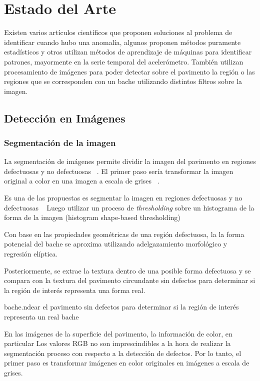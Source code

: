 \chapter{Estado del Arte}\label{chapter:state-of-the-art}

Existen varios artículos científicos que proponen soluciones al problema de identificar cuando hubo una anomalía, algunos proponen métodos
puramente estadísticos y otros utilizan métodos de aprendizaje de máquinas para identificar patrones, mayormente en la serie temporal del
acelerómetro. También utilizan procesamiento de imágenes para poder detectar sobre el pavimento la región o las regiones que se corresponden
con un bache utilizando distintos filtros sobre la imagen.

\section{Detección en Imágenes}

\subsection{Segmentación de la imagen}
La segmentación de imágenes permite  dividir la imagen del pavimento en regiones defectuosas y no defectuosas ~\parencite{koch2011pothole}.
El primer paso sería transformar la imagen original a color en una imagen a escala de grises  ~\parencite{koch2011pothole}.

Es una de las propuestas es segmentar la  imagen en regiones defectuosas y no defectuosas ~\parencite{koch2011pothole}
Luego utilizar un proceso de  \emph{thresholding} sobre un histograma de la forma de la imagen (histogram shape-based thresholding)

Con base en las propiedades geométricas de una región defectuosa, la
la forma potencial del bache se aproxima utilizando adelgazamiento morfológico y regresión elíptica.~\parencite{koch2011pothole}


Posteriormente, se extrae la textura dentro de una posible forma defectuosa y se compara con la textura del pavimento circundante 
sin defectos para determinar si la región de interés representa una forma real.

bache.ndear el pavimento sin defectos para determinar si la región de interés representa un real bache

En las imágenes de la superficie del pavimento, la información de color, en particular
Los valores RGB no son imprescindibles a la hora de realizar la segmentación proceso con respecto a 
la detección de defectos. Por lo tanto, el primer paso es transformar imágenes en color originales en 
imágenes a escala de grises.

